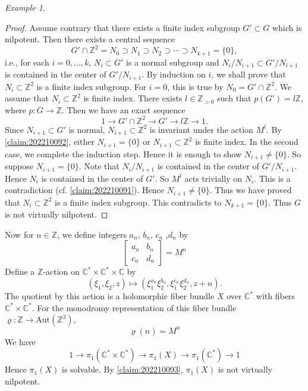 \documentclass[11pt,english]{smfart}
\theoremstyle{plain}
\theoremstyle{definition}
\theoremstyle{remark}
\newtheorem{example}[thm]{Example}
\numberwithin{equation}{subsection}
\theoremstyle{plain}
\newcommand{\bC}{\mathbb{C}}
\newcommand{\bZ}{\mathbb{Z}}
\begin{document}
\begin{example}
	\begin{proof}
		Assume contrary that there exists a finite index subgroup $G'\subset G$ which is nilpotent.
		Then there exists a central sequence 
		$$G'\cap \mathbb Z^2=N_0\supset N_1\supset N_2\supset \cdots\supset N_{k+1}=\{0\},$$ 
		i.e., for each $i=0,\ldots, k$, $N_i\subset G'$ is a normal subgroup and $N_i/N_{i+1}\subset G'/N_{i+1}$ is contained in the center of $G'/N_{i+1}$.
		By induction on $i$, we shall prove that $N_i\subset \mathbb Z^2$ is a finite index subgroup.
		For $i=0$, this is true by $N_0=G'\cap \mathbb Z^2$.
		We assume that $N_i\subset \mathbb Z^2$ is finite index.
		There exists $l\in\mathbb Z_{>0}$ such that $p(G')=l\mathbb Z$, where $p:G\to\mathbb Z$.
		Then we have an exact sequence
		$$
		1\to G'\cap \mathbb Z^2\to G'\to l\mathbb Z\to 1.
		$$
		Since $N_{i+1}\subset G'$ is normal, $N_{i+1}\subset \mathbb Z^2$ is invariant under the action $M^l$.
		By \cref{claim:202210092}, either $N_{i+1}=\{0\}$ or $N_{i+1}\subset \mathbb Z^2$ is finite index.
		In the second case, we complete the induction step.
		Hence it is enough to show $N_{i+1}\not=\{0\}$.
		So suppose $N_{i+1}=\{0\}$.
		Note that $N_i/N_{i+1}$ is contained in the center of $G'/N_{i+1}$.
		Hence $N_i$ is contained in the center of $G'$.
		So $M^l$ acts trivially on $N_i$.
		This is a contradiction (cf. \cref{claim:202210091}).
		Hence $N_{i+1}\not=\{0\}$.
		Thus we have proved that $N_i\subset \mathbb Z^2$ is a finite index subgroup.
		This contradicts to $N_{k+1}=\{0\}$.
		Thus $G$ is not virtually nilpotent.
	\end{proof}
	
	Now for $n\in\mathbb Z$, we define integers $a_n$, $b_n$, $c_n$ ,$d_n$ by
	\begin{equation*}
		\begin{bmatrix}
			a_n & b_n\\
			c_n & d_n
		\end{bmatrix}
		=M^n
	\end{equation*} 	
	Define a $\bZ$-action on $\bC^*\times\bC^*\times \bC$ by  
	$$
	(\xi_1,\xi_2,z)\mapsto (\xi_1^{a_n}\xi^{b_n}_2,\xi_1^{c_n}\xi^{d_n}_2,z+n).
	$$
	The quotient by this action is a holomorphic fiber bundle $X$ over $\mathbb C^*$  with fibers $\bC^*\times\bC^*$. For the monodromy representation of this fiber bundle  $\varrho:\bZ\to \mathrm{Aut}(\bZ^2)$,  
	\begin{equation*}
		\varrho(n)=M^n
	\end{equation*} 
	We have
	$$
	1\to \pi_1(\mathbb C^*\times \mathbb C^*)\to \pi_1(X)\to \pi_1(\mathbb C^*)\to 1
	$$
	Hence $\pi_1(X)$ is solvable.
	By \cref{claim:202210093}, $\pi_1(X)$ is not virtually nilpotent.
	
\end{example}
\end{document}

